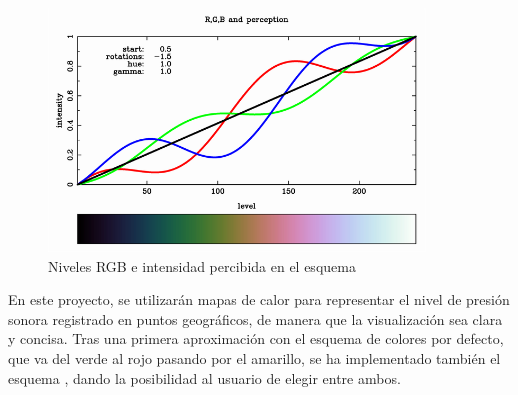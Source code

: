 \begin{figure}[h] \centering
    \includegraphics[width=10cm]{graphs/cubehelix.png}\caption{Niveles RGB e intensidad percibida en el esquema \cite{cubehelix}}\label{fig:cubehelix}
\end{figure}

    En este proyecto, se utilizarán mapas de calor para representar el nivel de presión sonora registrado en puntos geográficos, de manera que la visualización sea clara y concisa. Tras una primera aproximación con el esquema de colores por defecto, que va del verde al rojo pasando por el amarillo, se ha implementado también el esquema , dando la posibilidad al usuario de elegir entre ambos. 

\chapterend{}